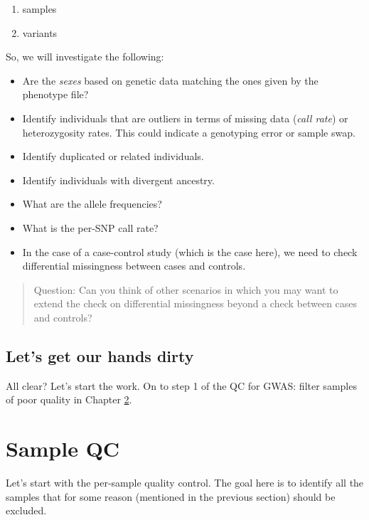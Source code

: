 \documentclass[
]{book}
\providecommand{\tightlist}{%
  \setlength{\itemsep}{0pt}\setlength{\parskip}{0pt}}
\begin{document}
\begin{enumerate}
\def\labelenumi{\arabic{enumi})}
\tightlist
\item
  samples
\item
  variants
\end{enumerate}

So, we will investigate the following:

\begin{itemize}
\tightlist
\item
  Are the \emph{sexes} based on genetic data matching the ones given by the phenotype file?
\item
  Identify individuals that are outliers in terms of missing data (\emph{call rate}) or heterozygosity rates. This could indicate a genotyping error or sample swap.
\item
  Identify duplicated or related individuals.
\item
  Identify individuals with divergent ancestry.
\item
  What are the allele frequencies?
\item
  What is the per-SNP call rate?
\item
  In the case of a case-control study (which is the case here), we need to check differential missingness between cases and controls.
\end{itemize}

\begin{quote}
Question: Can you think of other scenarios in which you may want to extend the check on differential missingness beyond a check between cases and controls?
\end{quote}

\hypertarget{lets-get-our-hands-dirty}{%
\section{Let's get our hands dirty}\label{lets-get-our-hands-dirty}}

All clear? Let's start the work. On to step 1 of the QC for GWAS: filter samples of poor quality in Chapter \ref{gwas-basics-sample-qc}.

\hypertarget{gwas-basics-sample-qc}{%
\chapter{Sample QC}\label{gwas-basics-sample-qc}}

Let's start with the per-sample quality control. The goal here is to identify all the samples that for some reason (mentioned in the previous section) should be excluded.
\end{document}
